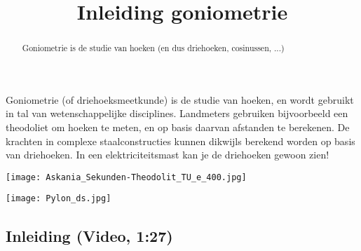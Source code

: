 \documentclass{ximera}
\title[Examples:]{Inleiding goniometrie}
\begin{document}
\begin{abstract}
	Goniometrie is de studie van hoeken (en dus driehoeken, cosinussen, ...)
\end{abstract}
\maketitle


Goniometrie (of driehoeksmeetkunde) is de studie van hoeken, en wordt gebruikt in tal van wetenschappelijke disciplines. Landmeters gebruiken bijvoorbeeld een theodoliet om hoeken te meten, en op basis daarvan afstanden te berekenen. De krachten in complexe staalconstructies  kunnen dikwijls berekend worden op basis van driehoeken. In een elektriciteitsmast kan je de driehoeken gewoon zien!

\begin{image}
	\texttt{[image: Askania\_Sekunden-Theodolit\_TU\_e\_400.jpg]}
\end{image}
\begin{image}
	\texttt{[image: Pylon\_ds.jpg]}
\end{image}


\subsection{Inleiding (Video, 1:27)}
\begin{expandable}
 \begin{center}
 \end{center}
\end{expandable}
\end{document}
